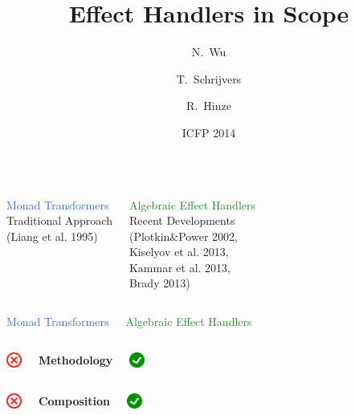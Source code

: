 \documentclass[xcolor=pdftex,dvipsnames,table]{beamer}
\title{Effect Handlers in Scope}
\author[Wu, Schrijvers, Hinze]
{N.~Wu\inst{1} \and T.~Schrijvers\inst{2} \and R.~Hinze\inst{1}}
\institute[VFU] %
{
  \inst{1}%
  University of Oxford
  \and
  \inst{2}%
  Ghent University
}
\date[ICFP 2014]{ICFP 2014}
\def\checkmark{\includegraphics[height=0.5cm]{checkmark.png}}
\def\crossmark{\includegraphics[height=0.5cm]{crossmark.png}}
\begin{document}
\frame{\titlepage}

\begin{frame}
  \begin{columns}[c]
    \begin{center}
      \Large{\textcolor{RoyalBlue}{Monad Transformers}}\\
      \small{Traditional Approach \\
      (Liang et al. 1995)}
    \end{center}

    \begin{center}
      \Large{\textcolor{ForestGreen}{Algebraic Effect Handlers}}\\
      \small{Recent Developments} \\
      \small{(Plotkin\&Power 2002, \\
      Kiselyov et al. 2013, \\
      Kammar et al. 2013, \\
      Brady 2013)}
    \end{center}
  \end{columns}
\end{frame}

\begin{frame}
  \begin{columns}[c]
    \begin{center}
      \Large{\textcolor{RoyalBlue}{Monad Transformers}}
    \end{center}
    \begin{center}
      \Large{\textcolor{ForestGreen}{Algebraic Effect Handlers}}
    \end{center}
  \end{columns}
  \bigskip
  \begin{columns}[c]
    \begin{center}
      \crossmark
    \end{center}
    \begin{center}
      \textbf{Methodology}
    \end{center}
    \begin{center}
      \checkmark
    \end{center}
  \end{columns}
  \begin{columns}[c]
    \begin{center}
      \crossmark
    \end{center}
    \begin{center}
      \textbf{Composition}
    \end{center}
    \begin{center}
      \checkmark
    \end{center}
  \end{columns}
\end{frame}
\end{document}
